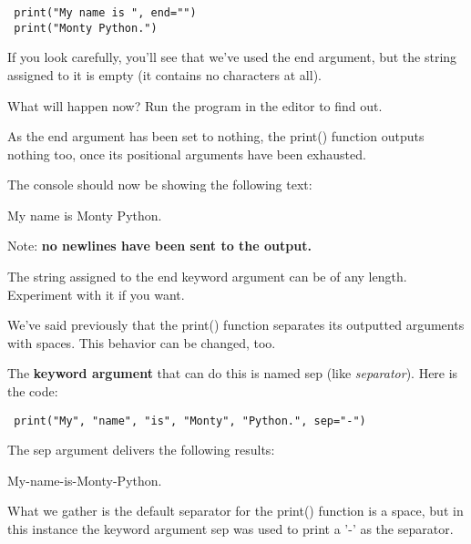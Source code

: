 \documentclass[a4paper,10pt]{article}
\begin{document}
\begin{verbatim}
 print("My name is ", end="")
 print("Monty Python.")
\end{verbatim}


If you look carefully, you'll see that we've used the {\selectfont end} argument, but the string assigned to it is empty (it contains no characters at all).
\newline

What will happen now? Run the program in the editor to find out.
\newline

As the {\selectfont end} argument has been set to nothing, the {\selectfont print()} function outputs nothing too, once its positional arguments have been exhausted.
\newline

The console should now be showing the following text:
\newline

{\selectfont My name is Monty Python.}
\newline

Note: \textbf{no newlines have been sent to the output.}
\newline

The string assigned to the end keyword argument can be of any length. Experiment with it if you want.
\newline



We've said previously that the {\selectfont print()} function separates its outputted arguments with spaces. This behavior can be changed, too.
\newline

The \textbf{keyword argument} that can do this is named {\selectfont sep} (like \textit{separator}). Here is the code:

\begin{verbatim}
 print("My", "name", "is", "Monty", "Python.", sep="-")
\end{verbatim}



The {\selectfont sep} argument delivers the following results:
\newline

{\selectfont My-name-is-Monty-Python.}
\newline

What we gather is the default separator for the {\selectfont print()} function is a space, but in this instance the keyword argument {\selectfont sep} was used to print a '-' as the separator.
\newline
\end{document}
